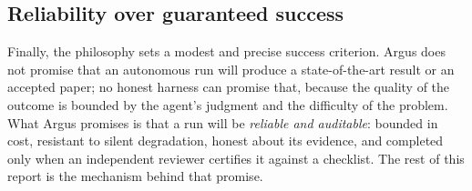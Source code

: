 \subsection{Reliability over guaranteed success}

Finally, the philosophy sets a modest and precise success criterion. Argus does
not promise that an autonomous run will produce a state-of-the-art result or an
accepted paper; no honest harness can promise that, because the quality of the
outcome is bounded by the agent's judgment and the difficulty of the problem.
What Argus promises is that a run will be \emph{reliable and auditable}: bounded
in cost, resistant to silent degradation, honest about its evidence, and
completed only when an independent reviewer certifies it against a checklist. The
rest of this report is the mechanism behind that promise.
